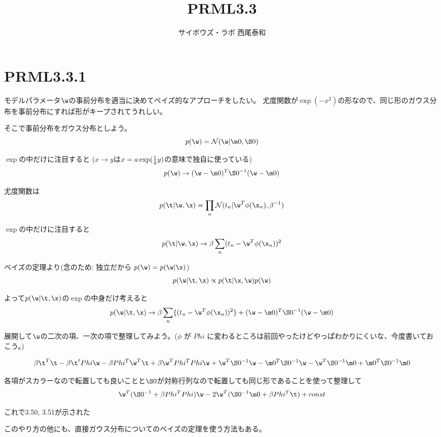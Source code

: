 \documentclass[a4paper]{jsarticle}
\newcommand{\inv}{^{-1}}
\newcommand{\Gauss}[1]{\mathcal{N}(#1)}
\begin{document}
\title{PRML3.3}
\author{サイボウズ・ラボ 西尾泰和}




\section{PRML3.3.1}

モデルパラメータ$\w$の事前分布を適当に決めてベイズ的なアプローチをしたい。
尤度関数が$\exp(-x^2)$の形なので、同じ形のガウス分布を事前分布にすれば形がキープされてうれしい。

そこで事前分布をガウス分布としよう。
\[ p(\w) = \Gauss{\w | \m0, \S0}\]

$\exp$の中だけに注目すると ($x \to y$は$x = a \exp ( {1 \over 2} y )$の意味で独自に使っている)
\[ p(\w) \to (\w - \m0)^T \S0\inv (\w - \m0) \]

尤度関数は
\[ p(\t | \w, \x) = \prod_n \Gauss{t_n | \w^T \phi(\x_n), \beta\inv} \]

$\exp$の中だけに注目すると
\[ p(\t | \w, \x) \to \beta \sum_n (t_n - \w^T \phi(\x_n))^2  \]

ベイズの定理より(念のため: 独立だから $p(\w) = p(\w | \x)$)
\[ p(\w | \t, \x) \propto p(\t | \x, \w) p(\w)\]

\begin{boxnote}
よって$p(\w | \t, \x)$の$\exp$の中身だけ考えると
\[ p(\w | \t, \x) \to \beta \sum_n \{ (t_n - \w^T \phi(\x_n))^2 \} + (\w - \m0)^T \S0\inv (\w - \m0)\]

展開して$\w$の二次の項、一次の項で整理してみよう。($\phi$ が $Phi$ に変わるところは前回やったけどやっぱわかりにくいな、今度書いておこう。)

\[ \beta\t^T\t -\beta\t^t Phi \w  -\beta Phi^T \w^T \t + \beta\w^T Phi^T Phi \w
+ 
\w^T \S0\inv\w
- \m0^T \S0\inv\w
- \w^T \S0\inv \m0
+ \m0^T \S0\inv \m0
\]

各項がスカラーなので転置しても良いことと$\S0$が対称行列なので転置しても同じ形であることを使って整理して
\[ \w^T(\S0\inv + \beta Phi^T Phi) \w - 2 \w^T (\S0\inv \m0 +\beta Phi^T \t)  + const\]

これで3.50, 3.51が示された
\end{boxnote}

このやり方の他にも、直接ガウス分布についてのベイズの定理を使う方法もある。

\BayesForGauss
\end{document}
